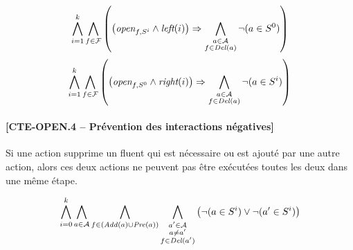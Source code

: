 \begin{small}
\[ \bigwedge\limits_{\substack{i=1}}^{k} \bigwedge\limits_{\substack{f\in \mathcal{F}}}\left(\left(\textit{open}_{f,S^{i}} \wedge \textit{left}(i) \right) \Rightarrow \bigwedge\limits_{\substack{a \in \mathcal{A}\\ f \in \mathit{Del}(a)}}\neg (a \in S^{0})\right) \]
\[ \bigwedge\limits_{\substack{i=1}}^{k} \bigwedge\limits_{\substack{f \in \mathcal{F}}} \left(\left(\textit{open}_{f,S^{0}} \wedge \textit{right}(i) \right) \Rightarrow \bigwedge\limits_{\substack{a \in \mathcal{A} \\ f \in \mathit{Del}(a)}}\neg (a \in S^{i})\right) \]
\end{small}

\paragraph*{[CTE-OPEN.4 -- Prévention des interactions négatives]}

Si une action supprime un fluent qui est nécessaire ou est ajouté par une autre action, alors ces deux actions ne peuvent pas être exécutées toutes les deux dans une même étape.

\begin{small}
\[ \bigwedge\limits_{\substack{i=0}}^{k} \bigwedge\limits_{\substack{a \in \mathcal{A}}} \bigwedge\limits_{\substack{f\in \left(\mathit{Add}(a) \cup \mathit{Pre}(a)\right)}} \bigwedge\limits_{\substack{a' \in \mathcal{A} \\ a \neq a' \\ f \in \mathit{Del}(a')}}\left(\neg (a \in S^{i}) \vee \neg (a' \in S^{i})\right) \]
\end{small}
